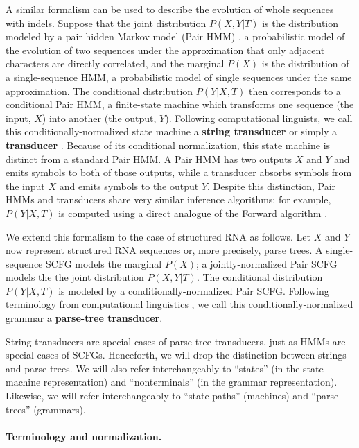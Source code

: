 \documentclass[10pt]{article}
\begin{document}
A similar formalism can be used to describe the evolution of whole
sequences with indels.
Suppose that the joint distribution $P (X, Y | T)$ is the distribution
modeled by a pair hidden Markov model (Pair HMM) \cite{Durbin98},
a probabilistic model of the evolution of two sequences under the
approximation that only adjacent characters are directly correlated,
and the marginal $P(X)$ is the distribution of a single-sequence HMM,
a probabilistic model of single sequences under the same approximation.
The conditional distribution $P(Y | X, T)$ then corresponds to a conditional Pair HMM,
a finite-state machine which transforms one sequence (the input, $X$) into another (the output, $Y$).
Following computational linguists, we call this conditionally-normalized state machine a
 {\bf string transducer} or simply a {\bf transducer}
\cite{BradleyHolmes2007}.
Because of its conditional normalization, this state machine is
distinct from a standard Pair HMM.
A Pair HMM has two outputs $X$ and $Y$ and emits symbols to both of those outputs,
while a transducer absorbs symbols from the input $X$ and emits
symbols to the output $Y$.
Despite this distinction, Pair HMMs and transducers share very similar inference algorithms;
for example, $P(Y | X, T)$ is computed using a direct analogue of the Forward algorithm \cite{Durbin98}.

We extend this formalism to the case of structured RNA as follows.
Let $X$ and $Y$ now represent structured RNA sequences or, more
precisely, parse trees.
A single-sequence SCFG models the marginal $P(X)$;
a jointly-normalized Pair SCFG \cite{Durbin98} models the the joint distribution $P (X, Y | T)$.
The conditional distribution $P(Y | X, T)$ is modeled by a conditionally-normalized Pair SCFG.
Following terminology from computational linguistics
\cite{ComonEtAl2007-TreeTransducers}, we call this
conditionally-normalized grammar a {\bf parse-tree transducer}.

String transducers are special cases of parse-tree transducers, just
as HMMs are special cases of SCFGs.
Henceforth, we will drop the distinction between strings and parse trees.
We will also refer interchangeably to ``states'' (in the state-machine representation)
and ``nonterminals'' (in the grammar representation).
Likewise, we will refer interchangeably to ``state paths'' (machines) and ``parse trees'' (grammars).


\paragraph{Terminology and normalization.}
\end{document}
